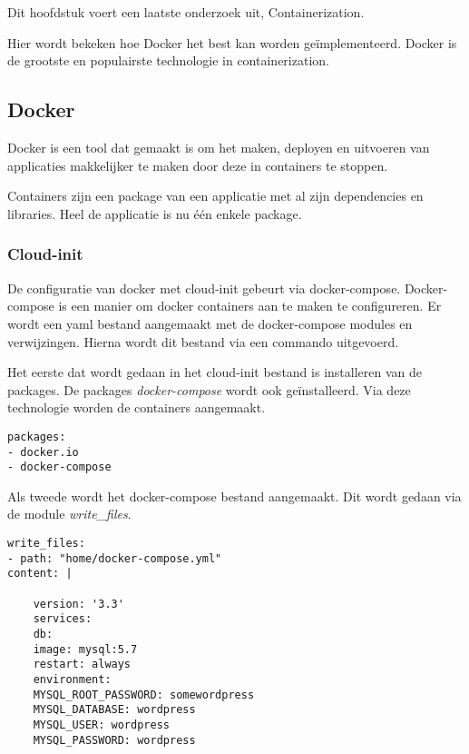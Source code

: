 \chapter{}
\label{ch:container}
Dit hoofdstuk voert een laatste onderzoek uit, Containerization.

Hier wordt bekeken hoe Docker het best kan worden geïmplementeerd. Docker is de grootste en populairste technologie in containerization.

\section{Docker}
Docker is een tool dat gemaakt is om het maken, deployen en uitvoeren van applicaties makkelijker te maken door deze in containers te stoppen. 

Containers zijn een package van een applicatie met al zijn dependencies en libraries. Heel de applicatie is nu één enkele package. \autocite{docker}

\subsection{Cloud-init}
De configuratie van docker met cloud-init gebeurt via docker-compose. Docker-compose is een manier om docker containers aan te maken te configureren. Er wordt een yaml bestand aangemaakt met de docker-compose modules en verwijzingen. Hierna wordt dit bestand via een commando uitgevoerd.

Het eerste dat wordt gedaan in het cloud-init bestand is installeren van de packages. De packages \textit{docker-compose} wordt ook geïnstalleerd. Via deze technologie worden de containers aangemaakt.
\begin{lstlisting}[basicstyle=\small]
packages:
- docker.io
- docker-compose
\end{lstlisting}

Als tweede wordt het docker-compose bestand aangemaakt. Dit wordt gedaan via de module \textit{write\_files}. 
\begin{lstlisting}[basicstyle=\small]
write_files:
- path: "home/docker-compose.yml"
content: |

    version: '3.3'
    services:
    db:
    image: mysql:5.7
    restart: always
    environment:
    MYSQL_ROOT_PASSWORD: somewordpress
    MYSQL_DATABASE: wordpress
    MYSQL_USER: wordpress
    MYSQL_PASSWORD: wordpress
\end{lstlisting}


